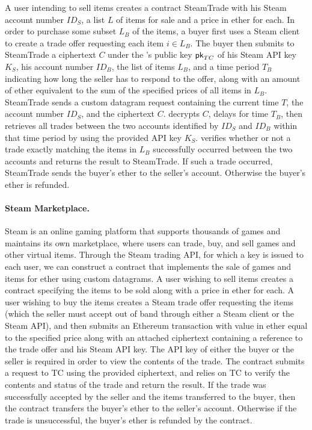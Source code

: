 A user intending to sell items creates a contract {\sf SteamTrade} with his Steam account number $ID_S$, a list $L$ of items for sale and a price in ether for each.  In order to purchase some subset $L_B$ of the items, a buyer first uses a Steam client to create a trade offer requesting each item $i \in L_B$.  The buyer then submits to {\sf SteamTrade} a ciphertext $C$ under the \tc's public key ${\sf pk}_{TC}$ of his Steam API key $K_S$, his account number $ID_B$, the list of items $L_B$, and a time period $T_B$ indicating how long the seller has to respond to the offer, along with an amount of ether equivalent to the sum of the specified prices of all items in $L_B$.  {\sf SteamTrade} sends \tc a custom datagram request containing the current time $T$, the account number $ID_S$, and the ciphertext $C$.  \tc decrypts $C$, delays for time $T_B$, then retrieves all trades between the two accounts identified by $ID_S$ and $ID_B$ within that time period by using the provided API key $K_S$.  \tc verifies whether or not a trade exactly matching the items in $L_B$ successfully occurred between the two accounts and returns the result to {\sf SteamTrade}.  If such a trade occurred, {\sf SteamTrade} sends the buyer's ether to the seller's account.  Otherwise the buyer's ether is refunded.


\iffalse
\paragraph{Steam Marketplace.} Steam  is an online gaming platform that supports thousands of games and maintains its own marketplace, where users can trade, buy, and sell games and other virtual items.  Through the Steam trading API, for which a key is issued to each user, we can construct a contract that implements the sale of games and items for ether using custom datagrams.  A user wishing to sell items creates a contract specifying the items to be sold along with a price in ether for each.  A user wishing to buy the items creates a Steam trade offer requesting the items (which the seller must accept out of band through either a Steam client or the Steam API), and then submits an Ethereum transaction with value in ether equal to the specified price along with an attached ciphertext containing a reference to the trade offer and his Steam API key.  The API key of either the buyer or the seller is required in order to view the contents of the trade.  The contract submits a request to TC using the provided ciphertext, and relies on TC to verify the contents and status of the trade and return the result.  If the trade was successfully accepted by the seller and the items transferred to the buyer, then the contract transfers the buyer's ether to the seller's account.  Otherwise if the trade is unsuccessful, the buyer's ether is refunded by the contract.

